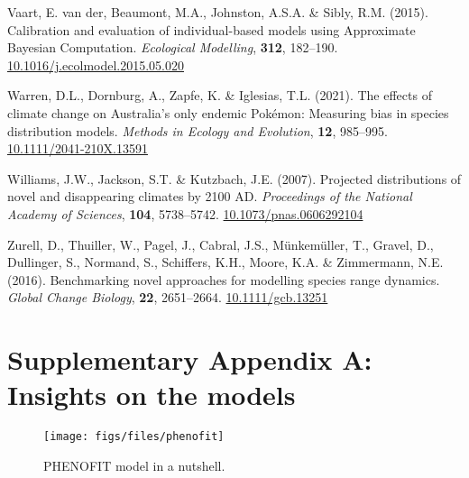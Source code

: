 \documentclass[11pt,]{article}
\newlength{\cslhangindent}
\newenvironment{CSLReferences}[2] %
 {%
  \setlength{\parindent}{0pt}
  \ifodd #1 \everypar{\setlength{\hangindent}{\cslhangindent}}\ignorespaces\fi
  \ifnum #2 > 0
  \setlength{\parskip}{#2\baselineskip}
  \fi
 }%
 {}
\begin{document}
\begin{CSLReferences}{1}{0}
\leavevmode{}%
Vaart, E. van der, Beaumont, M.A., Johnston, A.S.A. \& Sibly, R.M.
(2015). Calibration and evaluation of individual-based models using
{Approximate} {Bayesian} {Computation}. \emph{Ecological Modelling},
\textbf{312}, 182--190.
\href{https://doi.org/10.1016/j.ecolmodel.2015.05.020}{10.1016/j.ecolmodel.2015.05.020}

\leavevmode{}%
Warren, D.L., Dornburg, A., Zapfe, K. \& Iglesias, T.L. (2021). The
effects of climate change on {Australia}'s only endemic {Pokémon}:
{Measuring} bias in species distribution models. \emph{Methods in
Ecology and Evolution}, \textbf{12}, 985--995.
\href{https://doi.org/10.1111/2041-210X.13591}{10.1111/2041-210X.13591}

\leavevmode{}%
Williams, J.W., Jackson, S.T. \& Kutzbach, J.E. (2007). Projected
distributions of novel and disappearing climates by 2100 {AD}.
\emph{Proceedings of the National Academy of Sciences}, \textbf{104},
5738--5742.
\href{https://doi.org/10.1073/pnas.0606292104}{10.1073/pnas.0606292104}

\leavevmode{}%
Zurell, D., Thuiller, W., Pagel, J., Cabral, J.S., Münkemüller, T.,
Gravel, D., Dullinger, S., Normand, S., Schiffers, K.H., Moore, K.A. \&
Zimmermann, N.E. (2016). Benchmarking novel approaches for modelling
species range dynamics. \emph{Global Change Biology}, \textbf{22},
2651--2664. \href{https://doi.org/10.1111/gcb.13251}{10.1111/gcb.13251}

\end{CSLReferences}

\newpage

\hypertarget{appendixA}{%
\section{Supplementary Appendix A: Insights on the
models}\label{appendixA}}

\renewcommand*\thetable{A.\arabic{table}}
\renewcommand*\thefigure{A.\arabic{figure}}

\setcounter{figure}{0}
\setcounter{table}{0}

\renewcommand*{\thepage}{A--\arabic{page}}

\begin{figure}[htbp]

{\centering \texttt{[image: figs/files/phenofit]} 

}

\caption{PHENOFIT model in a nutshell.}\label{fig:phenofit_model}
\end{figure}
\end{document}
